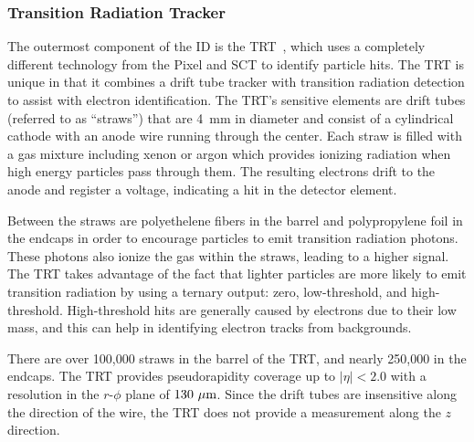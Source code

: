 \subsubsection{Transition Radiation Tracker} \label{sec:trt}
The outermost component of the ID is the TRT~\cite{2008.trt-tubes, 2008.trt-barrel, 2008.trt-endcap}, which uses a completely different technology from the Pixel and SCT to identify particle hits.
The TRT is unique in that it combines a drift tube tracker with transition radiation detection to assist with electron identification.
The TRT's sensitive elements are drift tubes (referred to as ``straws'') that are 4~mm in diameter and consist of a cylindrical cathode with an anode wire running through the center.
Each straw is filled with a gas mixture including xenon or argon which provides ionizing radiation when high energy particles pass through them.
The resulting electrons drift to the anode and register a voltage, indicating a hit in the detector element.

Between the straws are polyethelene fibers in the barrel and polypropylene foil in the endcaps in order to encourage particles to emit transition radiation photons.
These photons also ionize the gas within the straws, leading to a higher signal.
The TRT takes advantage of the fact that lighter particles are more likely to emit transition radiation by using a ternary output: zero, low-threshold, and high-threshold.
High-threshold hits are generally caused by electrons due to their low mass, and this can help in identifying electron tracks from backgrounds. 

There are over 100,000 straws in the barrel of the TRT, and nearly 250,000 in the endcaps.
The TRT provides pseudorapidity coverage up to $|\eta| < 2.0$ with a resolution in the $r$-$\phi$ plane of $130~\mu\textrm{m}$.
Since the drift tubes are insensitive along the direction of the wire, the TRT does not provide a measurement along the $z$ direction.
